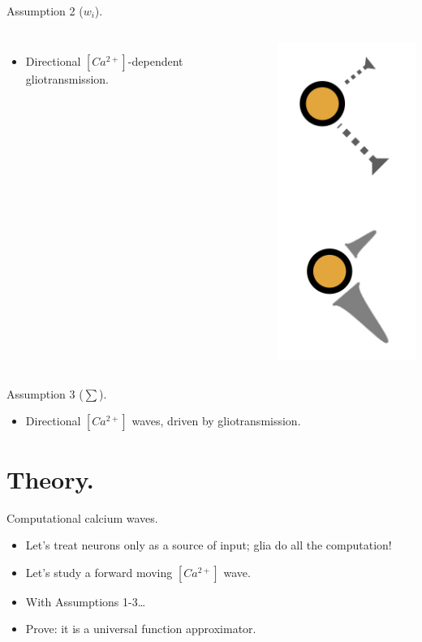 \documentclass[10pt]{beamer}
\begin{document}
\begin{frame}[fragile]{Assumption 2 ($w_i$).}
\begin{columns}
\begin{itemize}
    \item \alert{Directional} $[Ca^{2+}]$-dependent gliotransmission.
\end{itemize}
    \centering
    \includegraphics[scale=0.4]{images/gliotrans.jpeg}
\end{columns}
\end{frame}

\begin{frame}[fragile]{Assumption 3 ($\sum$).}
\begin{itemize}
    \item \alert{Directional} $[Ca^{2+}]$ waves, driven by gliotransmission.
\end{itemize}
\end{frame}

\section[In theory.]{Theory.}
\begin{frame}[fragile]{Computational calcium waves.}
\begin{itemize}
\item Let's treat neurons only as a source of input; glia do all the computation!
\item Let's study a forward moving $[Ca^{2+}]$ wave.
\item With Assumptions 1-3\ldots
\item \alert{Prove}: it is a universal function approximator.
\end{itemize}
\end{frame}
\end{document}

